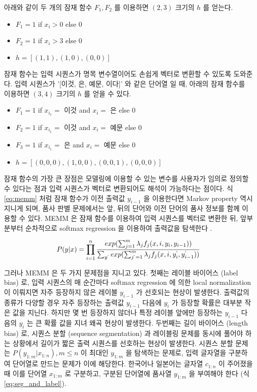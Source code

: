 \documentclass[11pt]{article}
\begin{document}
아래와 같이 두 개의 잠재 함수 $F_1, F_2$ 를 이용하면 $(2, 3)$ 크기의 $h$ 를 얻는다.

\begin{itemize}
  \item $F_1 = 1$ if $x_i > 0$ else $0$
  \item $F_2 = 1$ if $x_i > 3$ else $0$
  \item $h = [(1, 1), (1, 0), (0, 0)]$
\end{itemize}

잠재 함수는 입력 시퀀스가 명목 변수열이어도 손쉽게 벡터로 변환할 수 있도록 도와준다.
입력 시퀀스가 '[이것, 은, 예문, 이다]' 와 같은 단어열 일 때, 아래의 잠재 함수를 이용하면 $(3, 4)$ 크기의 $h$ 를 얻을 수 있다.

\begin{itemize}
  \item $F_1 = 1$ if $x_{i_1} =$ 이것 and $x_{i} =$ 은 else $0$
  \item $F_2 = 1$ if $x_{i_1} =$ 이것 and $x_{i} =$ 예문 else $0$
  \item $F_3 = 1$ if $x_{i_1} =$ 은 and $x_{i} =$ 예문 else $0$
  \item $h = [(0, 0, 0), (1, 0, 0), (0, 0, 1), (0, 0, 0)]$
\end{itemize}

잠재 함수의 가장 큰 장점은 모델링에 이용할 수 있는 변수를 사용자가 임의로 정의할 수 있다는 점과 입력 시퀀스가 벡터로 변환되어도 해석이 가능하다는 점이다.
식 \ref{eq:memm} 처럼 잠재 함수가 이전 출력값 $y_{i-1}$ 을 이용한다면 Markov property 역시 지니게 되며, 품사 판별 문제에서는 앞, 뒤의 단어와 이전 단어의 품사 정보를 함께 이용할 수 있다.
MEMM 은 잠재 함수를 이용하여 입력 시퀀스를 벡터로 변환한 뒤, 앞부분부터 순차적으로 softmax regression 을 이용하여 출력값을 탐색한다 \citep{mccallum2000maximum}.

\begin{equation}
  \label{eq:memm}
  P(y \vert x) = \prod_{i=1}^{n} \frac{exp(\sum_{j=1}^{m} \lambda_j f_j (x, i, y_i, y_{i-1}))}{ \sum_{y^{`}} exp(\sum_{j^{`}=1}^{m} \lambda_j f_j (x, i, y_i^{`}, y_{i-1}^{`})) }
\end{equation}

그러나 MEMM 은 두 가지 문제점을 지니고 있다.
첫째는 레이블 바이어스 (label bias) 로, 입력 시퀀스의 매 순간마다 softmax regression 에 의한 local normalization 이 이뤄지면 자주 등장하지 않은 레이블 $y_{i-1}$ 가 선호되는 현상이 발생한다\citep{lafferty2001conditional, kudo2004applying, andor2016globally}.
출력값의 종류가 다양할 경우 자주 등장하는 출력값 $y_{i-1}$ 다음에 $y_i$ 가 등장할 확률은 대부분 작은 값을 지닌다.
하지만 몇 번 등장하지 않더나 특정 레이블 앞에만 등장하는 $y_{i-1}$ 다음의 $y_i$ 는 큰 확률 값을 지녀 왜곡 현상이 발생한다.
두번째는 길이 바이어스 (length bias) 로, 시퀀스 분할 (sequence segmentation) 과 레이블링 문제를 동시에 풀어야 하는 상황에서 길이가 짧은 출력 시퀀스를 선호하는 현상이 발생한다.
시퀀스 분할 문제는 $P(y_{1:m} \vert x_{1:n}), m \le n$ 이 최대인 $y_{1:m}$ 을 탐색하는 문제로, 입력 글자열을 구분하여 단어열로 만드는 문제가 이에 해당한다.
한국어나 일본어는 글자열 $c_{1:n}$ 이 주어졌을 때 이를 단어열 $x_{1:m}$ 로 구분하고, 구분된 단어열에 품사열 $y_{1:m}$ 을 부여해야 한다 (식 \ref{eq:seg_and_label}).
\end{document}
